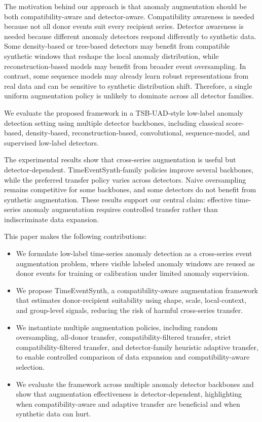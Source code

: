 \documentclass[conference]{IEEEtran}
\begin{document}
The motivation behind our approach is that anomaly augmentation should be both compatibility-aware and detector-aware. Compatibility awareness is needed because not all donor events suit every recipient series. Detector awareness is needed because different anomaly detectors respond differently to synthetic data. Some density-based or tree-based detectors may benefit from compatible synthetic windows that reshape the local anomaly distribution, while reconstruction-based models may benefit from broader event oversampling. In contrast, some sequence models may already learn robust representations from real data and can be sensitive to synthetic distribution shift. Therefore, a single uniform augmentation policy is unlikely to dominate across all detector families.

We evaluate the proposed framework in a TSB-UAD-style low-label anomaly detection setting using multiple detector backbones, including classical score-based, density-based, reconstruction-based,
convolutional, sequence-model, and supervised low-label detectors.

The experimental results show that cross-series augmentation is useful but detector-dependent. TimeEventSynth-family policies improve several backbones,
while the preferred transfer policy varies across detectors. Naive oversampling remains competitive for some backbones, and some detectors do not benefit from
synthetic augmentation. These results support our central claim: effective time-series anomaly augmentation requires controlled transfer rather than indiscriminate data expansion.

This paper makes the following contributions:
\begin{itemize}
\item We formulate low-label time-series anomaly detection as a cross-series event augmentation problem, where visible labeled anomaly windows are reused as donor events for training or calibration under limited anomaly supervision.

\item We propose TimeEventSynth, a compatibility-aware augmentation framework that estimates donor-recipient suitability using shape, scale, local-context, and group-level signals, reducing the risk of harmful cross-series transfer.

\item We instantiate multiple augmentation policies, including random oversampling, all-donor transfer, compatibility-filtered transfer, strict compatibility-filtered transfer, and detector-family heuristic adaptive transfer, to enable controlled comparison of data expansion and compatibility-aware selection.

\item We evaluate the framework across multiple anomaly detector backbones and show that augmentation effectiveness is detector-dependent, highlighting when compatibility-aware and adaptive transfer are beneficial and when synthetic data can hurt.

\end{itemize}
\end{document}
